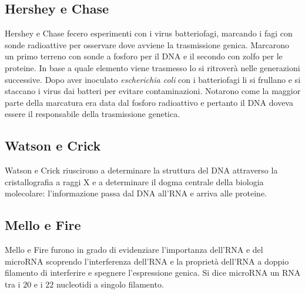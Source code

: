 \subsection{Hershey e Chase}
Hershey e Chase fecero esperimenti con i virus batteriofagi, marcando i fagi con sonde radioattive per osservare dove avviene la trasmissione genica. Marcarono un primo terreno con 
sonde a fosforo \emph{} per il DNA e il secondo con zolfo \emph{} per le proteine. In base a quale elemento viene trasmesso lo si ritrover\`a nelle generazioni 
successive. Dopo aver inoculato \emph{escherichia coli} con i batteriofagi li si frullano e si staccano i virus dai batteri per evitare contaminazioni. Notarono come la maggior parte 
della marcatura era data dal fosforo radioattivo e pertanto il DNA doveva essere il responsabile della trasmissione genetica. 
\subsection{Watson e Crick}
Watson e Crick riuscirono a determinare la struttura del DNA attraverso la cristallografia a raggi X e a determinare il dogma centrale della biologia molecolare: l'informazione passa 
dal DNA all'RNA e arriva alle proteine. 
\subsection{Mello e Fire}
Mello e Fire furono in grado di evidenziare l'importanza dell'RNA e del microRNA scoprendo l'interferenza dell'RNA e la propriet\`a dell'RNA a doppio filamento di interferire e spegnere
l'espressione genica. Si dice microRNA un RNA tra i $20$ e i $22$ nucleotidi a singolo filamento. 

